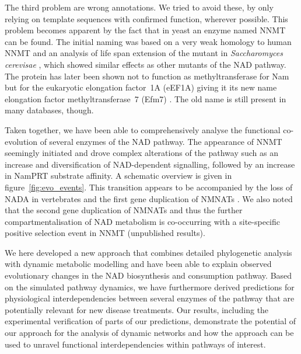 The third problem are wrong annotations. We tried to avoid these, by only relying on template sequences with confirmed function, wherever possible. This problem becomes apparent by the fact that in yeast an enzyme named NNMT can be found. The initial naming was based on a very weak homology to human NNMT and an analysis of life span extension of the mutant in \textit{Saccharomyces cerevisae} \cite{Anderson2003}, which showed similar effects as other mutants of the NAD pathway. The protein has later been shown not to function as methyltransferase for Nam but for the eukaryotic elongation factor~1A (eEF1A) giving it its new name elongation factor methyltransferase~7 (Efm7) \cite{Hamey2016}. The old name is still present in many databases, though.

Taken together, we have been able to comprehensively analyse the functional co-evolution of several enzymes of the NAD pathway. The appearance of NNMT seemingly initiated and drove complex alterations of the pathway such as an increase and diversification of NAD-dependent signalling, followed by an increase in NamPRT substrate affinity. A schematic overview is given in figure~\ref{fig:evo_events}. This transition appears to be accompanied by the loss of NADA in vertebrates and the first gene duplication of NMNATs \cite{Lau2010}. We also noted that the second gene duplication of NMNATs and thus the further compartmentalisation of NAD metabolism is co-occurring with a site-specific positive selection event in NNMT (unpublished results).

We here developed a new approach that combines detailed phylogenetic analysis with dynamic metabolic modelling and have been able to explain observed evolutionary changes in the NAD biosynthesis and consumption pathway. Based on the simulated pathway dynamics, we have furthermore derived predictions for physiological interdependencies between several enzymes of the pathway that are potentially relevant for new disease treatments. Our results, including the experimental verification of parts of our predictions, demonstrate the potential of our approach for the analysis of dynamic networks and how the approach can be used to unravel functional interdependencies within pathways of interest.
